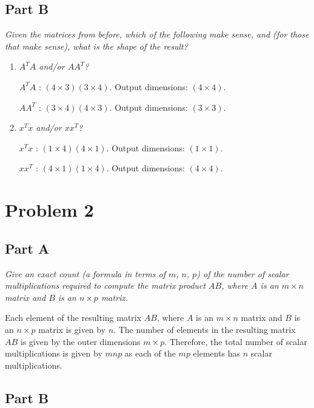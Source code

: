 \documentclass{article}
\begin{document}
\subsection*{Part B}

\textit{Given the matrices from before, which of the following make sense, and
(for those that make sense), what is the shape of the result?}

\begin{enumerate}
    \item \textit{$ A^T A $ and/or $ A A^T $?}

        $ A^T A $ : $ (4 \times 3) (3 \times 4) $. Output dimensions: $ (4
        \times 4) $.

        $ A A^T $ : $ (3 \times 4) (4 \times 3) $. Output dimensions: $ (3
        \times 3) $.

    \item \textit{$ x^T x $ and/or $ x x^T $?}

        $ x^T x $ : $ (1 \times 4) (4 \times 1) $. Output dimensions: $ (1
        \times 1) $.

        $ x x^T $ : $ (4 \times 1) (1 \times 4) $. Output dimensions: $ (4
        \times 4) $.
\end{enumerate}

\section*{Problem 2}

\subsection*{Part A}

\textit{Give an exact count (a formula in terms of $ m $, $ n $, $ p $) of the
number of scalar multiplications required to compute the matrix product $ AB $,
where $ A $ is an $ m \times n $ matrix and  $ B $ is an $ n \times p $ matrix.}

\bigbreak

Each element of the resulting matrix $ AB $, where $ A $ is an $ m \times n $
matrix and $ B $ is an $ n \times p $ matrix is given by $ n $. The number of
elements in the resulting matrix $ AB $ is given by the outer dimensions $ m
\times p $. Therefore, the total number of scalar multiplications is given by $
m n p $ as each of the $ mp $ elements has $ n $ scalar multiplications.

\subsection*{Part B}
\end{document}
